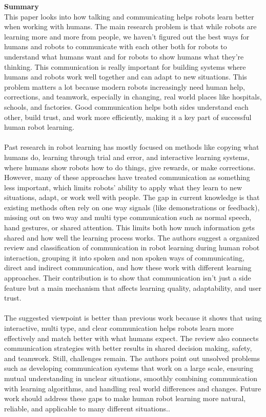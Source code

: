 \documentclass[report.tex]{subfiles}
\begin{document}
\noindent\textbf{Summary} \\
This paper looks into how talking and communicating helps robots learn better when working with humans. The main research problem is that while robots are learning more and more from people, we haven't figured out the best ways for humans and robots to communicate with each other both for robots to understand what humans want and for robots to show humans what they're thinking. This communication is really important for building systems where humans and robots work well together and can adapt to new situations.
This problem matters a lot because modern robots increasingly need human help, corrections, and teamwork, especially in changing, real world places like hospitals, schools, and factories. Good communication helps both sides understand each other, build trust, and work more efficiently, making it a key part of successful human robot learning.\\\\
Past research in robot learning has mostly focused on methods like copying what humans do, learning through trial and error, and interactive learning systems, where humans show robots how to do things, give rewards, or make corrections. However, many of these approaches have treated communication as something less important, which limits robots' ability to apply what they learn to new situations, adapt, or work well with people.
The gap in current knowledge is that existing methods often rely on one way signals (like demonstrations or feedback), missing out on two way and multi type communication such as normal speech, hand gestures, or shared attention. This limits both how much information gets shared and how well the learning process works.
The authors suggest a organized review and classification of communication in robot learning during human robot interaction, grouping it into spoken and non spoken ways of communicating, direct and indirect communication, and how these work with different learning approaches. Their contribution is to show that communication isn't just a side feature but a main mechanism that affects learning quality, adaptability, and user trust.
\noindent\textbf{}\\\\The suggested viewpoint is better than previous work because it shows that using interactive, multi type, and clear communication helps robots learn more effectively and match better with what humans expect. The review also connects communication strategies with better results in shared decision making, safety, and teamwork.
Still, challenges remain. The authors point out unsolved problems such as developing communication systems that work on a large scale, ensuring mutual understanding in unclear situations, smoothly combining communication with learning algorithms, and handling real world differences and changes. Future work should address these gaps to make human robot learning more natural, reliable, and applicable to many different situations..\\\\
\end{document}
